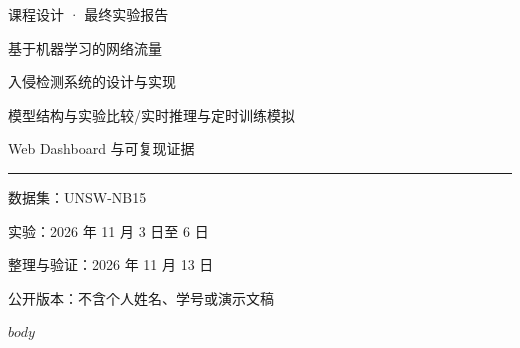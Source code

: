 \documentclass[UTF8,a4paper,11pt,fontset=fandol]{ctexart}
\begin{document}
\begin{titlepage}
\vspace*{18mm}
{\large\color{ReportBlue}课程设计 · 最终实验报告\par}
\vspace{24mm}
{\fontsize{25}{38}\selectfont 基于机器学习的网络流量\par 入侵检测系统的设计与实现\par}
\vspace{14mm}
{\large 模型结构与实验比较\quad /\quad 实时推理与定时训练模拟\par}
\vspace{5mm}
{\large Web Dashboard 与可复现证据\par}
\vfill
\noindent\rule{\textwidth}{0.5pt}
\vspace{5mm}
\noindent 数据集：UNSW-NB15\par
\noindent 实验：2026 年 11 月 3 日至 6 日\par
\noindent 整理与验证：2026 年 11 月 13 日\par
\noindent 公开版本：不含个人姓名、学号或演示文稿\par
\vspace{12mm}
\end{titlepage}
\begingroup
\small\linespread{1}\selectfont
\setlength{\parskip}{0pt}
\tableofcontents
\endgroup
\clearpage
{}
$body$
\end{document}
